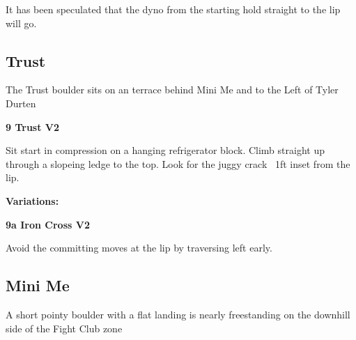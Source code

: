 \begin{multicols}{2}
\begin{adjustwidth}{0.5cm}{}
\begin{minipage}{\linewidth}
							\begin{adjustwidth}{0.5cm}{}				
							It has been speculated that the dyno from the starting hold straight to the lip will go.
							\end{adjustwidth}
							\end{minipage}
						\end{adjustwidth}
			\subsection*{Trust}\label{bf:Trust}
			\begin{minipage}{\columnwidth}
			The Trust boulder sits on an terrace behind Mini Me and to the Left of Tyler Durten
			\end{minipage}
			

					\begin{minipage}{\linewidth}	
					\label{rt:Trust}
\colorbox{green!20}{
\parbox{0.95\textwidth}{
\textbf{
9 Trust V2     
}
}
}

					\begin{adjustwidth}{0.5cm}{}				
					Sit start in compression on a hanging refrigerator block. Climb straight up through a slopeing ledge to the top. Look for the juggy crack ~1ft inset from the lip.
					\end{adjustwidth}
					\end{minipage}
						\begin{adjustwidth}{0.5cm}{}				
						\textbf{Variations:} \newline
							\begin{minipage}{\linewidth}	
							\label{vr:Iron Cross}
\colorbox{green!20}{
\parbox{0.95\textwidth}{
\textbf{
9a Iron Cross V2   
}
}
}

							\begin{adjustwidth}{0.5cm}{}				
							Avoid the committing moves at the lip by traversing left early.
							\end{adjustwidth}
							\end{minipage}
						\end{adjustwidth}
			\subsection*{Mini Me}\label{bf:Mini Me}
			\begin{minipage}{\columnwidth}
			A short pointy boulder with a flat landing is nearly freestanding on the downhill side of the Fight Club zone
			\end{minipage}
			

\end{multicols}
